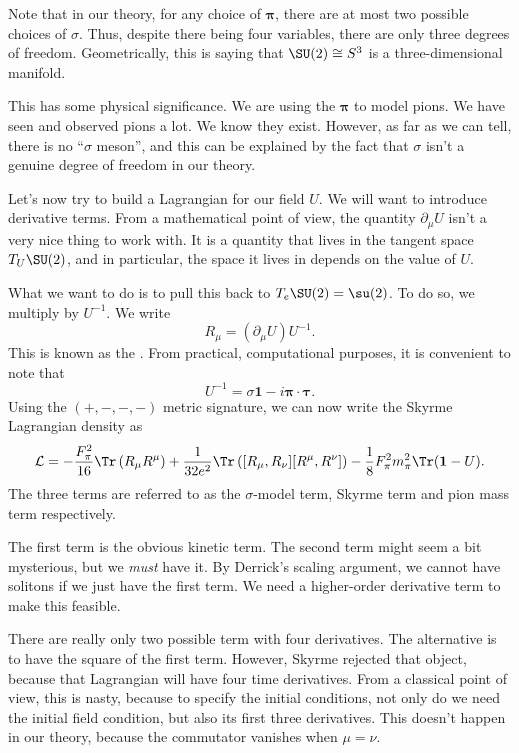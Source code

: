 \documentclass[a4paper]{article}
\begin{document}
Note that in our theory, for any choice of $\boldsymbol\pi$, there are at most two possible choices of $\sigma$. Thus, despite there being four variables, there are only three degrees of freedom. Geometrically, this is saying that $\SU(2) \cong S^3$ is a three-dimensional manifold.

This has some physical significance. We are using the $\boldsymbol\pi$ to model pions. We have seen and observed pions a lot. We know they exist. However, as far as we can tell, there is no ``$\sigma$ meson'', and this can be explained by the fact that $\sigma$ isn't a genuine degree of freedom in our theory.

Let's now try to build a Lagrangian for our field $U$. We will want to introduce derivative terms. From a mathematical point of view, the quantity $\partial_\mu U$ isn't a very nice thing to work with. It is a quantity that lives in the tangent space $T_U \SU(2)$, and in particular, the space it lives in depends on the value of $U$.

What we want to do is to pull this back to $T_e \SU(2) = \su(2)$. To do so, we multiply by $U^{-1}$. We write
\[
  R_\mu = (\partial_\mu U)U^{-1}.
\]
This is known as the . From practical, computational purposes, it is convenient to note that
\[
  U^{-1} = \sigma \mathbf{1} - i \boldsymbol\pi \cdot \boldsymbol\tau.
\]
Using the $(+, -, -, -)$ metric signature, we can now write the Skyrme Lagrangian density as
\[
  \mathcal{L} =-\frac{F_{\pi}^2 }{16} \Tr \left( R_\mu R^\mu\right) +\frac{1}{32e^2}\Tr\left([R_\mu, R_\nu][R^\mu, R^\nu]\right) - \frac{1}{8} F_\pi^2 m_\pi^2 \Tr(\mathbf{1} - U).
\]
The three terms are referred to as the $\sigma$-model term, Skyrme term and pion mass term respectively.

The first term is the obvious kinetic term. The second term might seem a bit mysterious, but we \emph{must} have it. By Derrick's scaling argument, we cannot have solitons if we just have the first term. We need a higher-order derivative term to make this feasible.

There are really only two possible term with four derivatives. The alternative is to have the square of the first term. However, Skyrme rejected that object, because that Lagrangian will have four time derivatives. From a classical point of view, this is nasty, because to specify the initial conditions, not only do we need the initial field condition, but also its first three derivatives. This doesn't happen in our theory, because the commutator vanishes when $\mu = \nu$.
\end{document}
